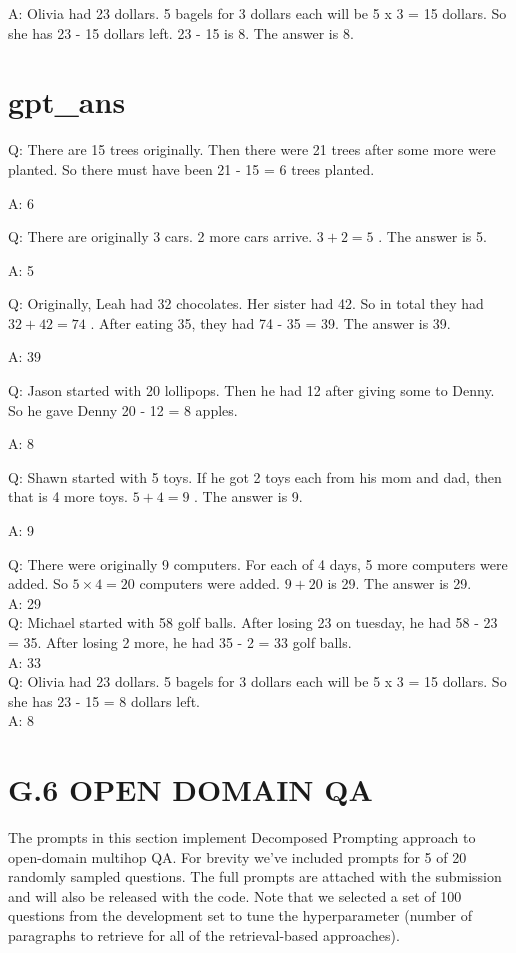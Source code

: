 \documentclass[
]{article}
\begin{document}
A: Olivia had 23 dollars. 5 bagels for 3 dollars each will be 5 x 3 = 15
dollars. So she has 23 - 15 dollars left. 23 - 15 is 8. The answer is 8.

\section{gpt\_ans}\label{gpt_ans}

Q: There are 15 trees originally. Then there were 21 trees after some
more were planted. So there must have been 21 - 15 = 6 trees planted.

A: 6

Q: There are originally 3 cars. 2 more cars arrive. \(3 + 2 = 5\) . The
answer is 5.

A: 5

Q: Originally, Leah had 32 chocolates. Her sister had 42. So in total
they had \(32 + 42 = 74\) . After eating 35, they had 74 - 35 = 39. The
answer is 39.

A: 39

Q: Jason started with 20 lollipops. Then he had 12 after giving some to
Denny. So he gave Denny 20 - 12 = 8 apples.

A: 8

Q: Shawn started with 5 toys. If he got 2 toys each from his mom and
dad, then that is 4 more toys. \(5 + 4 = 9\) . The answer is 9.

A: 9

Q: There were originally 9 computers. For each of 4 days, 5 more
computers were added. So \(5 \times 4 = 20\) computers were added.
\(9 + 20\) is 29. The answer is 29.\\
A: 29\\
Q: Michael started with 58 golf balls. After losing 23 on tuesday, he
had 58 - 23 = 35. After losing 2 more, he had 35 - 2 = 33 golf balls.\\
A: 33\\
Q: Olivia had 23 dollars. 5 bagels for 3 dollars each will be 5 x 3 = 15
dollars. So she has 23 - 15 = 8 dollars left.\\
A: 8

\section{G.6 OPEN DOMAIN QA}\label{g.6-open-domain-qa}

The prompts in this section implement Decomposed Prompting approach to
open-domain multihop QA. For brevity we've included prompts for 5 of 20
randomly sampled questions. The full prompts are attached with the
submission and will also be released with the code. Note that we
selected a set of 100 questions from the development set to tune the
hyperparameter (number of paragraphs to retrieve for all of the
retrieval-based approaches).
\end{document}
